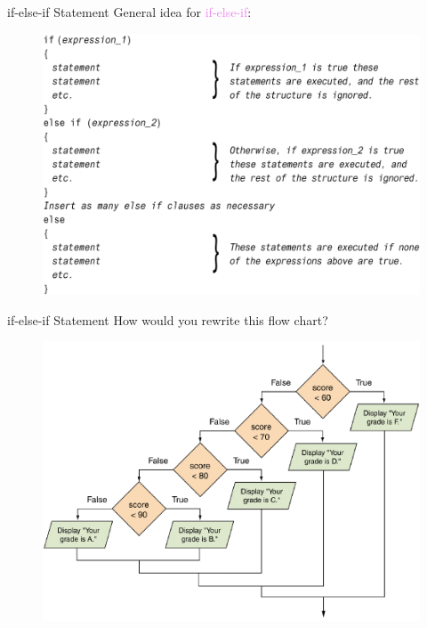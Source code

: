 \documentclass[11pt]{beamer}
\newcommand{\violet}[1]{\textcolor{violet}{#1}}
\begin{document}
\begin{frame}{if-else-if Statement}
    General idea for \violet{if-else-if}:
    \noindent 
    \begin{figure}[H]
    \centering
    \includegraphics[scale=0.25]{Images/chapter03_ifElseIf.png}
    \end{figure}
\end{frame}

\begin{frame}{if-else-if Statement}
    How would you rewrite this flow chart?
    \noindent 
    \begin{figure}[H]
    \centering
    \includegraphics[scale=0.25]{Images/chapter03_nestedIfGradeProgram.png}
    \end{figure}
\end{frame}
\end{document}
